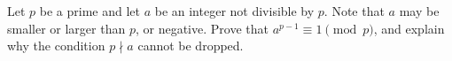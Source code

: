 Let $p$ be a prime and let $a$ be an integer not divisible by $p$. Note that $a$ may be smaller or larger than $p$, or negative. Prove that $a^{p-1}\equiv1\pmod p$, and explain why the condition $p\nmid a$ cannot be dropped.
